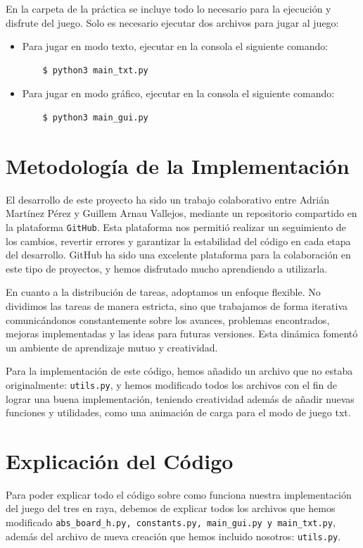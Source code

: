 \documentclass[a4paper,12pt]{article}
\begin{document}
En la carpeta de la práctica se incluye todo lo necesario para la ejecución y disfrute del juego. Solo es necesario
ejecutar dos archivos para jugar al juego:

\begin{itemize}
    \item Para jugar en modo texto, ejecutar en la consola el siguiente comando:
    \begin{verbatim}
    $ python3 main_txt.py
    \end{verbatim}
    \item Para jugar en modo gráfico, ejecutar en la consola el siguiente comando:
    \begin{verbatim}
    $ python3 main_gui.py
    \end{verbatim}
\end{itemize}

\section{Metodología de la Implementación}
El desarrollo de este proyecto ha sido un trabajo colaborativo entre Adrián Martínez Pérez y Guillem Arnau Vallejos,
mediante un repositorio compartido en la plataforma \texttt{GitHub}. Esta plataforma nos permitió realizar un seguimiento
de los cambios, revertir errores y garantizar la estabilidad del código en cada etapa del desarrollo. GitHub ha sido una 
excelente plataforma para la colaboración en este tipo de proyectos, y hemos disfrutado mucho aprendiendo a utilizarla.

\vspace{\baselineskip}
En cuanto a la distribución de tareas, adoptamos un enfoque flexible. No dividimos las tareas de manera estricta, sino que
trabajamos de forma iterativa comunicándonos constantemente sobre los avances, problemas encontrados, mejoras implementadas y 
las ideas para futuras versiones. Esta dinámica fomentó un ambiente de aprendizaje mutuo y creatividad.

\vspace{\baselineskip}
Para la implementación de este código, hemos añadido un archivo que no estaba originalmente: \texttt{utils.py}, y hemos
modificado todos los archivos con el fin de lograr una buena implementación, teniendo creatividad además de añadir nuevas
funciones y utilidades, como una animación de carga para el modo de juego txt.

\section{Explicación del Código}
Para poder explicar todo el código sobre como funciona nuestra implementación del juego del tres en raya, debemos de explicar
todos los archivos que hemos modificado \texttt{abs\_board\_h.py, constants.py, main\_gui.py y main\_txt.py}, además del archivo 
de nueva creación que hemos incluido nosotros: \texttt{utils.py}.
\end{document}
